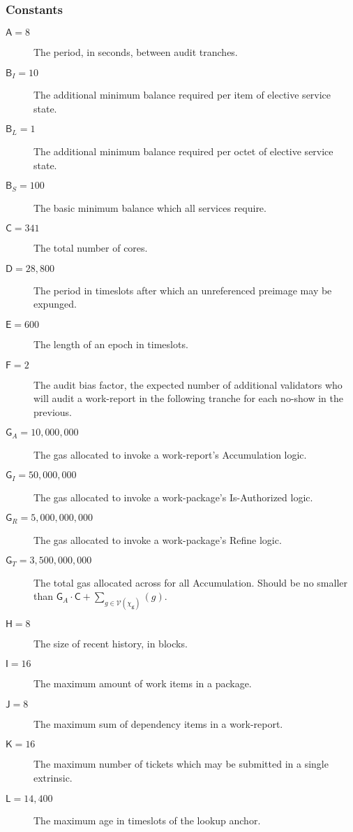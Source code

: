 \subsubsection{Constants}

\begin{description}
  \item[$\mathsf{A} = 8$] The period, in seconds, between audit tranches.
  \item[$\mathsf{B}_I = 10$] The additional minimum balance required per item of elective service state.
  \item[$\mathsf{B}_L = 1$] The additional minimum balance required per octet of elective service state.
  \item[$\mathsf{B}_S = 100$] The basic minimum balance which all services require.
  \item[$\mathsf{C} = 341$] The total number of cores.
  \item[$\mathsf{D} = 28,800$] The period in timeslots after which an unreferenced preimage may be expunged.
  \item[$\mathsf{E} = 600$] The length of an epoch in timeslots.
  \item[$\mathsf{F} = 2$] The audit bias factor, the expected number of additional validators who will audit a work-report in the following tranche for each no-show in the previous.
  \item[$\mathsf{G}_A = 10,000,000$] The gas allocated to invoke a work-report's Accumulation logic.
  \item[$\mathsf{G}_I = 50,000,000$] The gas allocated to invoke a work-package's Is-Authorized logic.
  \item[$\mathsf{G}_R = 5,000,000,000$] The gas allocated to invoke a work-package's Refine logic.
  \item[$\mathsf{G}_T = 3,500,000,000$] The total gas allocated across for all Accumulation. Should be no smaller than $\mathsf{G}_A\cdot\mathsf{C} + \sum_{g \in \mathcal{V}(\chi_\mathbf{g})}(g)$.
  \item[$\mathsf{H} = 8$] The size of recent history, in blocks.
  \item[$\mathsf{I} = 16$] The maximum amount of work items in a package.
  \item[$\mathsf{J} = 8$] The maximum sum of dependency items in a work-report.
  \item[$\mathsf{K} = 16$] The maximum number of tickets which may be submitted in a single extrinsic.
  \item[$\mathsf{L} = 14,400$] The maximum age in timeslots of the lookup anchor.

\end{description}

